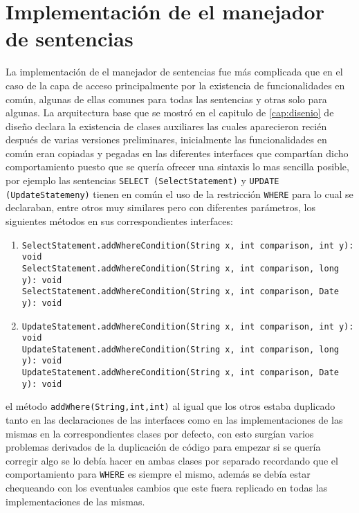 \section{Implementación de el manejador de sentencias}
La implementación de el manejador de sentencias fue más complicada que en el caso de la capa de acceso principalmente por la existencia de funcionalidades en común, algunas de ellas comunes para todas las sentencias y otras solo para algunas. La arquitectura base que se mostró en el capitulo de \ref{cap:disenio} de diseño declara la existencia de clases auxiliares las cuales aparecieron recién después de varias versiones preliminares, inicialmente las funcionalidades en común eran copiadas y pegadas en las diferentes interfaces que compartían dicho comportamiento puesto que se quería ofrecer una sintaxis lo mas sencilla posible, por ejemplo las sentencias \verb=SELECT (SelectStatement)= y \verb=UPDATE (UpdateStatemeny)= tienen en común el uso de la restricción \verb=WHERE= para lo cual se declaraban, entre otros muy similares pero con diferentes parámetros, los siguientes métodos en sus correspondientes interfaces:
%
\begin{enumerate}
\item \verb=SelectStatement.addWhereCondition(String x, int comparison, int y): void= \\
	\verb=SelectStatement.addWhereCondition(String x, int comparison, long y): void= \\
	\verb=SelectStatement.addWhereCondition(String x, int comparison, Date y): void= \\
\item \verb=UpdateStatement.addWhereCondition(String x, int comparison, int y): void= \\
	\verb=UpdateStatement.addWhereCondition(String x, int comparison, long y): void= \\
	\verb=UpdateStatement.addWhereCondition(String x, int comparison, Date y): void= \\
\end{enumerate}   
%
el método \verb=addWhere(String,int,int)= al igual que los otros estaba duplicado tanto en las declaraciones de las interfaces como en las implementaciones de las mismas en la correspondientes clases por defecto, con esto surgían varios problemas derivados de la duplicación de código para empezar si se quería corregir algo se lo debía hacer en ambas clases por separado recordando que el comportamiento para \verb=WHERE= es siempre el mismo, además se debía estar chequeando con los eventuales cambios que este fuera replicado en todas las implementaciones de las mismas.


